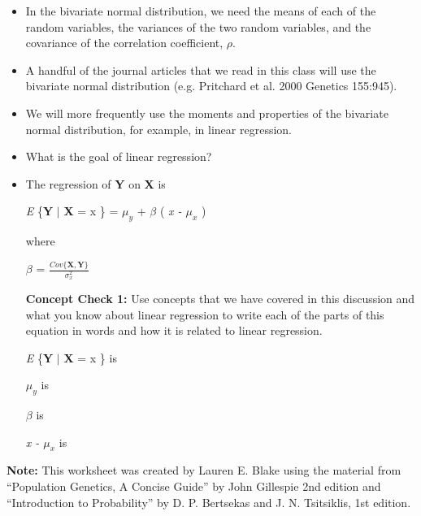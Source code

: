 \documentclass[12pt]{report}
\begin{document}
\begin{itemize}

\item In the bivariate normal distribution, we need the means of each of the random variables, the variances of the two random variables, and the covariance of the correlation coefficient, $\rho$.

\item A handful of the journal articles that we read in this class will use the bivariate normal distribution (e.g. Pritchard et al. 2000 Genetics 155:945). 

\item We will more frequently use the moments and properties of the bivariate normal distribution, for example, in linear regression. 

\item What is the goal of linear regression? 

\bigskip

\bigskip

\bigskip


\item The regression of \textbf{Y} on \textbf{X} is 


 \textit{E} \{\textbf{Y} $\mid$ \textbf{X} = x \} = $\mu_{y}$ + $\beta$ \big( \textit{x - $\mu_{x}$} \big)
 
\bigskip
where 

$\beta$ =  $\frac{Cov \{ \textbf{X},\textbf{Y} \} }{ \sigma_{x}^{2}} $

\bigskip
\textbf{Concept Check 1:} Use concepts that we have covered in this discussion and what you know about linear regression to write each of the parts of this equation in words and how it is related to linear regression. 

\bigskip  

\textit{E} \{\textbf{Y} $\mid$ \textbf{X} = x \} is 

\bigskip

\bigskip

\bigskip

$\mu_{y}$ is

\bigskip

\bigskip

\bigskip

$\beta$ is

\bigskip

\bigskip

\bigskip

 \textit{x - $\mu_{x}$} is
 
 \bigskip

\bigskip

\bigskip
 


\end{itemize}


 \bigskip

\bigskip

\bigskip

\textbf{Note:} This worksheet was created by Lauren E. Blake using the material from ``Population Genetics, A Concise Guide'' by John Gillespie 2nd edition and ``Introduction to Probability'' by D. P. Bertsekas and J. N. Tsitsiklis, 1st edition.
\end{document}
